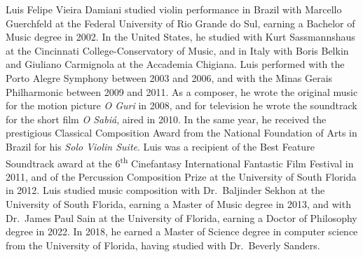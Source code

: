 Luis Felipe Vieira Damiani studied violin performance in Brazil with Marcello Guerchfeld at the Federal University of Rio Grande do Sul, earning a Bachelor of Music degree in 2002. In the United States, he studied with Kurt Sassmannshaus at the Cincinnati College-Conservatory of Music, and in Italy with Boris Belkin and Giuliano Carmignola at the Accademia Chigiana. Luis performed with the Porto Alegre Symphony between 2003 and 2006, and with the Minas Gerais Philharmonic between 2009 and 2011. As a composer, he wrote the original music for the motion picture \emph{O Guri} in 2008, and for television he wrote the soundtrack for the short film \emph{O Sabi\'a}, aired in 2010. In the same year, he received the prestigious Classical Composition Award from the National Foundation of Arts in Brazil for his \emph{Solo Violin Suite}. Luis was a recipient of the Best Feature Soundtrack award at the 6\textsuperscript{th} Cinefantasy International Fantastic Film Festival in 2011, and of the Percussion Composition Prize at the University of South Florida in 2012. Luis studied music composition with Dr.~Baljinder Sekhon at the University of South Florida, earning a Master of Music degree in 2013, and with Dr.~James Paul Sain at the University of Florida, earning a Doctor of Philosophy degree in 2022. In 2018, he earned a Master of Science degree in computer science from the University of Florida, having studied with Dr.~Beverly Sanders.
